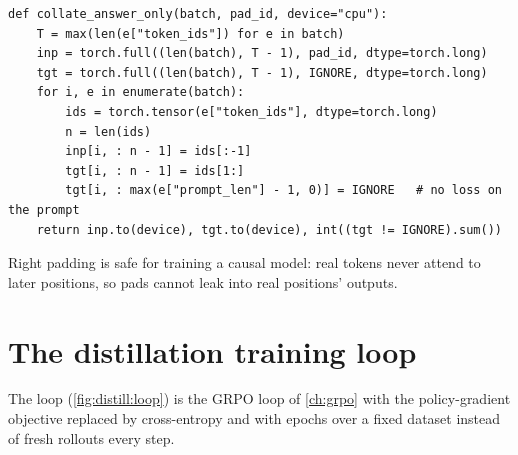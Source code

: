\begin{lstlisting}[caption={Padded batch with prompt and pad positions masked out.},
label={lst:distill:collate}]
def collate_answer_only(batch, pad_id, device="cpu"):
    T = max(len(e["token_ids"]) for e in batch)
    inp = torch.full((len(batch), T - 1), pad_id, dtype=torch.long)
    tgt = torch.full((len(batch), T - 1), IGNORE, dtype=torch.long)
    for i, e in enumerate(batch):
        ids = torch.tensor(e["token_ids"], dtype=torch.long)
        n = len(ids)
        inp[i, : n - 1] = ids[:-1]
        tgt[i, : n - 1] = ids[1:]
        tgt[i, : max(e["prompt_len"] - 1, 0)] = IGNORE   # no loss on the prompt
    return inp.to(device), tgt.to(device), int((tgt != IGNORE).sum())
\end{lstlisting}

Right padding is safe for training a causal model: real tokens never attend to later
positions, so pads cannot leak into real positions' outputs.

\section{The distillation training loop}\label{sec:distill:loop}

The loop (\cref{fig:distill:loop}) is the GRPO loop of \cref{ch:grpo} with the policy-gradient
objective replaced by cross-entropy and with epochs over a fixed dataset instead of fresh
rollouts every step.

